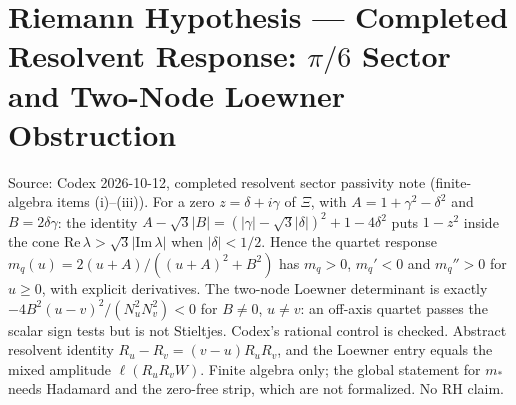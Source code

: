 \documentclass{report}
\theoremstyle{definition}
\begin{document}
\section{Riemann Hypothesis --- Completed Resolvent Response: $\pi/6$ Sector and Two-Node Loewner Obstruction}
Source: Codex 2026-10-12, completed resolvent sector passivity note (finite-algebra items (i)--(iii)). For a zero $z=\delta+i\gamma$ of $\Xi$, with $A=1+\gamma^2-\delta^2$ and $B=2\delta\gamma$: the identity $A-\sqrt3|B|=(|\gamma|-\sqrt3|\delta|)^2+1-4\delta^2$ puts $1-z^2$ inside the cone $\mathrm{Re}\,\lambda>\sqrt3|\mathrm{Im}\,\lambda|$ when $|\delta|<1/2$. Hence the quartet response $m_q(u)=2(u+A)/((u+A)^2+B^2)$ has $m_q>0$, $m_q'<0$ and $m_q''>0$ for $u\ge0$, with explicit derivatives. The two-node Loewner determinant is exactly $-4B^2(u-v)^2/(N_u^2N_v^2)<0$ for $B\ne0$, $u\ne v$: an off-axis quartet passes the scalar sign tests but is not Stieltjes. Codex's rational control is checked. Abstract resolvent identity $R_u-R_v=(v-u)R_uR_v$, and the Loewner entry equals the mixed amplitude $\ell(R_uR_vW)$. Finite algebra only; the global statement for $m_*$ needs Hadamard and the zero-free strip, which are not formalized. No RH claim.
\end{document}
